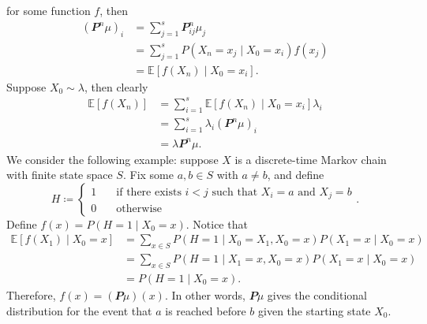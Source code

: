 \documentclass[math, code]{amznotes}
\theoremstyle{remark}
\begin{document}
for some function $f$, then 
\begin{align*}
    \left(\mathbfit{P}^n\mu\right)_i & = \sum_{j = 1}^{s}\mathbfit{P}^n_{ij}\mu_j \\
    & = \sum_{j = 1}^{s}P\left(X_n = x_j \mid X_0 = x_i\right)f\left(x_j\right) \\
    & = \mathbb{E}\left[f\left(X_n\right) \mid X_0 = x_i\right].
\end{align*}
Suppose $X_0 \sim \lambda$, then clearly 
\begin{align*}
    \mathbb{E}\left[f\left(X_n\right)\right] & = \sum_{i = 1}^{s}\mathbb{E}\left[f\left(X_n\right) \mid X_0 = x_i\right]\lambda_i \\
    & = \sum_{i = 1}^{s}\lambda_i\left(\mathbfit{P}^n\mu\right)_i \\
    & = \lambda\mathbfit{P}^n\mu.
\end{align*}
We consider the following example: suppose $X$ is a discrete-time Markov chain with finite state space $S$. Fix some $a, b \in S$ with $a \neq b$, and define 
\begin{equation*}
    H \coloneqq \begin{cases}
        1 & \quad\textrm{if there exists } i < j \textrm{ such that } X_i = a \textrm{ and } X_j = b \\
        0 & \quad\textrm{otherwise}
    \end{cases}.
\end{equation*}
Define $f\left(x\right) = P\left(H = 1 \mid X_0 = x\right)$. Notice that 
\begin{align*}
    \mathbb{E}\left[f\left(X_1\right) \mid X_0 = x\right] & = \sum_{x \in S}P\left(H = 1 \mid X_0 = X_1, X_0 = x\right)P\left(X_1 = x \mid X_0 = x\right) \\
    & = \sum_{x \in S}P\left(H = 1 \mid X_1 = x, X_0 = x\right)P\left(X_1 = x \mid X_0 = x\right) \\
    & = P\left(H = 1 \mid X_0 = x\right).
\end{align*}
Therefore, $f\left(x\right) = \left(\mathbfit{P}\mu\right)\left(x\right)$. In other words, $\mathbfit{P}\mu$ gives the conditional distribution for the event that $a$ is reached before $b$ given the starting state $X_0$.
\end{document}
